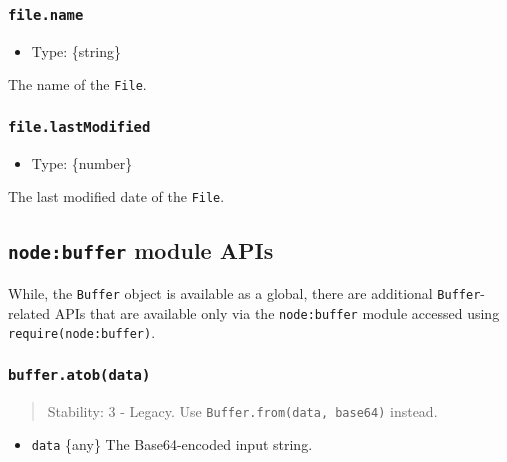 \subsubsection{\texorpdfstring{\texttt{file.name}}{file.name}}\label{file.name}

\begin{itemize}
\tightlist
\item
  Type: \{string\}
\end{itemize}

The name of the \texttt{File}.

\subsubsection{\texorpdfstring{\texttt{file.lastModified}}{file.lastModified}}\label{file.lastmodified}

\begin{itemize}
\tightlist
\item
  Type: \{number\}
\end{itemize}

The last modified date of the \texttt{File}.

\subsection{\texorpdfstring{\texttt{node:buffer} module
APIs}{node:buffer module APIs}}\label{nodebuffer-module-apis}

While, the \texttt{Buffer} object is available as a global, there are
additional \texttt{Buffer}-related APIs that are available only via the
\texttt{node:buffer} module accessed using
\texttt{require(\textquotesingle{}node:buffer\textquotesingle{})}.

\subsubsection{\texorpdfstring{\texttt{buffer.atob(data)}}{buffer.atob(data)}}\label{buffer.atobdata}

\begin{quote}
Stability: 3 - Legacy. Use
\texttt{Buffer.from(data,\ \textquotesingle{}base64\textquotesingle{})}
instead.
\end{quote}

\begin{itemize}
\tightlist
\item
  \texttt{data} \{any\} The Base64-encoded input string.
\end{itemize}

